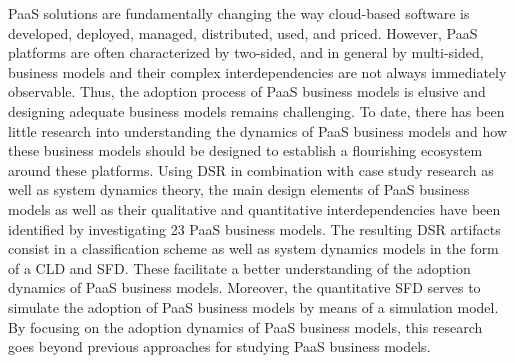 
\ac{PaaS} solutions are fundamentally changing the way cloud-based software is developed, deployed, managed, distributed, used, and priced. However, \ac{PaaS} platforms are often characterized by two-sided, and in general by multi-sided, business models and their complex interdependencies are not always immediately observable. Thus, the adoption process of \ac{PaaS} business models is elusive and designing adequate business models remains challenging. To date, there has been little research into understanding the dynamics of \ac{PaaS} business models and how these business models should be designed to establish a flourishing ecosystem around these platforms. Using \ac{DSR} in combination with case study research as well as system dynamics theory, the main design elements of \ac{PaaS} business models as well as their qualitative and quantitative interdependencies have been identified by investigating 23 PaaS business models. The resulting \ac{DSR} artifacts consist in a classification scheme as well as system dynamics models in the form of a \ac{CLD} and \ac{SFD}. These facilitate a better understanding of the adoption dynamics of \ac{PaaS} business models. Moreover, the quantitative \ac{SFD} serves to simulate the adoption of \ac{PaaS} business models by means of a simulation model. By focusing on the adoption dynamics of \ac{PaaS} business models, this research goes beyond previous approaches for studying \ac{PaaS} business models.


\vspace*{5mm}

